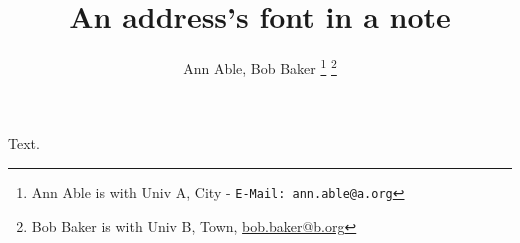 \documentclass{IEEEtran}
\begin{document}
\title{An address's font in a note}
\author{Ann Able, Bob Baker
\thanks{ Ann Able is with Univ A, City - \texttt{E-Mail: ann.able@a.org}}
\thanks{ Bob Baker is with Univ B, Town, \href{mailto:bob.baker@b.org}{bob.baker@b.org}}}
\maketitle
Text.
\end{document}
